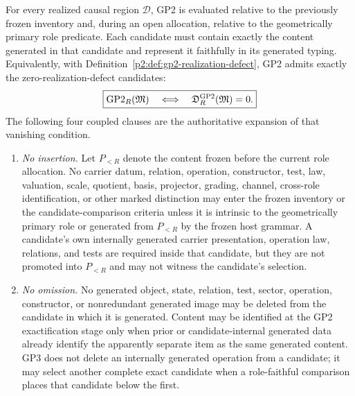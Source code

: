 \documentclass[12pt,a4paper]{article}
\begin{document}
\begin{mdframed}[style=postulatebox,nobreak=false]
\begin{postulate}
\label{p2:post:GP2}
For every realized causal region \(\mathcal D\), GP2 is evaluated relative to
the previously frozen inventory and, during an open allocation, relative to
the geometrically primary role predicate.  Each candidate must contain exactly
the content generated in that candidate and represent it faithfully in its
generated typing.  Equivalently, with
Definition~\ref{p2:def:gp2-realization-defect}, GP2 admits exactly the
zero-realization-defect candidates:
\[
 \boxed{
 \mathrm{GP2}_R(\mathfrak M)
 \quad\Longleftrightarrow\quad
 \mathfrak D_R^{\rm GP2}(\mathfrak M)=0.}
\]
The following four coupled clauses are the authoritative expansion of that
vanishing condition.

\begin{enumerate}[label=(\roman*),leftmargin=2em]
\item \emph{No insertion.}  Let \(P_{<R}\) denote the content frozen before
the current role allocation.  No carrier datum, relation, operation,
constructor, test, law, valuation, scale, quotient, basis, projector, grading,
channel, cross-role identification, or other marked distinction may enter the
frozen inventory or the candidate-comparison criteria unless it is intrinsic
to the geometrically primary role or generated from \(P_{<R}\) by the frozen
host grammar.  A candidate's own internally generated carrier presentation,
operation law, relations, and tests are required inside that candidate, but
they are not promoted into \(P_{<R}\) and may not witness the candidate's
selection.

\item \emph{No omission.}  No generated object, state, relation, test, sector,
operation, constructor, or nonredundant generated image may be deleted from
the candidate in which it is generated.  Content may be identified at the GP2
exactification stage only when prior or candidate-internal generated data
already identify the apparently separate item as the same generated content.
GP3 does not delete an internally generated operation from a candidate; it may
select another complete exact candidate when a role-faithful comparison places
that candidate below the first.


\end{enumerate}
\end{postulate}
\end{mdframed}
\end{document}
